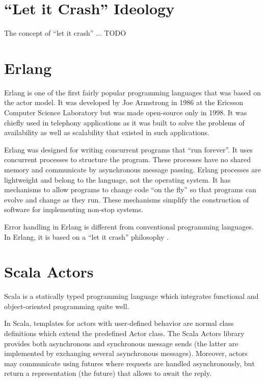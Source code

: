 \section{“Let it Crash” Ideology}
The concept of “let it crash” ...
TODO
\label{sec:letItCrash}

\section{Erlang}
Erlang is one of the first fairly popular programming languages that was based on the actor model.\cite{vinoski} It was developed by Joe Armstrong in 1986 at the Ericsson Computer Science Laboratory but was made open-source only in 1998. It was chiefly used in telephony applications as it was built to solve the problems of availability as well as scalability that existed in such applications.~\parencite{armstrong}

Erlang was designed for writing concurrent programs that “run forever”. It uses concurrent processes to structure the program. These processes have no shared memory and communicate by asynchronous message passing. Erlang processes are lightweight and belong to the language, not the operating system. It has mechanisms to allow programs to change code “on the fly” so that programs can evolve and change as they run. These mechanisms simplify the construction of software for implementing non-stop systems.~\parencite{armstrong}

Error handling in Erlang is different from conventional programming languages. In Erlang, it is based on a “let it crash” philosophy \cite{armstrong}.
\cite{Armstrong:2010:ERL:1810891.1810910}

\section{Scala Actors}
Scala is a statically typed programming language which integrates functional and object-oriented programming quite well.\cite{Odersky}

In Scala, templates for actors with user-defined behavior are normal class definitions which extend the predefined Actor class.
The Scala Actors library provides both asynchronous and synchronous message sends (the latter are implemented by exchanging several asynchronous messages). Moreover, actors may communicate using futures where requests are handled asynchronously, but return a representation (the future) that allows to await the reply.~\parencite{scalaActors}

